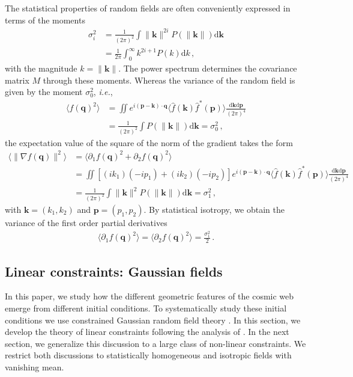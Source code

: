 \documentclass[a4paper, 11pt]{article}
\begin{document}
The statistical properties of random fields are often conveniently expressed in terms of the moments
\begin{align}
\sigma_i^2 &= \frac{1}{(2\pi)^2} \int \|\bm{k}\|^{2i}P(\|\bm{k}\|)\mathrm{d}\bm{k}\nonumber\\
&= \frac{1}{2\pi} \int_0^\infty k^{2i+1}P(k)\mathrm{d}k\,,
\end{align}
with the magnitude $k = \|\bm{k}\|$. The power spectrum determines the covariance matrix $M$ through these moments. Whereas the variance of the random field is given by the moment $\sigma_0^2$, \textit{i.e.},
\begin{align}
\langle f(\bm{q})^2 \rangle &= \iint e^{i (\bm{p} - \bm{k})\cdot \bm{q}} \langle \hat{f}(\bm{k})\hat{f}^*(\bm{p})\rangle \frac{\mathrm{d}\bm{k}\mathrm{d}\bm{p}}{(2\pi)^4}\nonumber\\
&=\frac{1}{(2\pi)^2}\int P(\|\bm{k}\|)\mathrm{d}\bm{k}=\sigma_0^2\,,
\end{align}
the expectation value of the square of the norm of the gradient takes the form
\begin{align}
\langle \|\nabla f(\bm{q})\|^2\rangle &= \langle \partial_1f(\bm{q})^2 + \partial_2 f(\bm{q})^2 \rangle \nonumber \\
&= \iint [(ik_1)(-ip_1)+(ik_2)(-ip_2)] e^{i (\bm{p} - \bm{k})\cdot \bm{q}} \langle \hat{f}(\bm{k})\hat{f}^*(\bm{p})\rangle \frac{\mathrm{d}\bm{k}\mathrm{d}\bm{p}}{(2\pi)^4}\nonumber \\
&=\frac{1}{(2\pi)^2}\int \|\bm{k}\|^2 P(\|\bm{k}\|)\mathrm{d}\bm{k}=\sigma_1^2\,,
\end{align}
with $\bm{k}=(k_1,k_2)$ and $\bm{p}=(p_1,p_2)$. By statistical isotropy, we obtain the variance of the first order partial derivatives
\begin{align}
\langle \partial_1 f(\bm{q})^2\rangle =\langle \partial_2 f(\bm{q})^2\rangle =\frac{\sigma_1^2}{2}\,.
\end{align}


\subsection{Linear constraints: Gaussian fields}
In this paper, we study how the different geometric features of the cosmic web emerge from different initial conditions. To systematically study these initial conditions we use constrained Gaussian random field theory \cite{Bertschinger:1987, Hoffman:1991, Sheth:1995, Weygaert:1996}. In this section, we develop the theory of linear constraints following the analysis of \cite{Weygaert:1996}. In the next section, we generalize this discussion to a large class of non-linear constraints. We restrict both discussions to statistically homogeneous and isotropic fields with vanishing mean.
\end{document}
